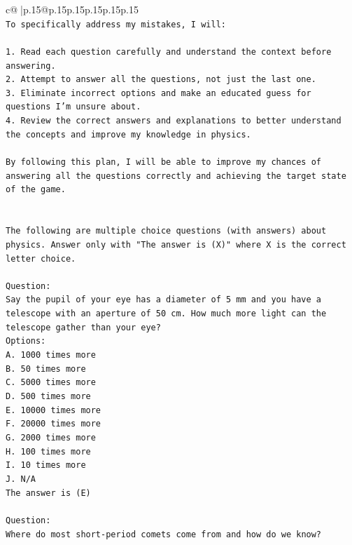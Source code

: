 \documentclass{article}
\begin{document}
{\begin{supertabular}{c@{$\;$}|p{.15\linewidth}@{}p{.15\linewidth}p{.15\linewidth}p{.15\linewidth}p{.15\linewidth}p{.15\linewidth}}
{{{\\ 
\texttt{To specifically address my mistakes, I will:} \\
\\ 
\texttt{1. Read each question carefully and understand the context before answering.} \\
\texttt{2. Attempt to answer all the questions, not just the last one.} \\
\texttt{3. Eliminate incorrect options and make an educated guess for questions I'm unsure about.} \\
\texttt{4. Review the correct answers and explanations to better understand the concepts and improve my knowledge in physics.} \\
\\ 
\texttt{By following this plan, I will be able to improve my chances of answering all the questions correctly and achieving the target state of the game.} \\
\\ 
\\ 
\texttt{The following are multiple choice questions (with answers) about physics. Answer only with "The answer is (X)" where X is the correct letter choice.} \\
\\ 
\texttt{Question:} \\
\texttt{Say the pupil of your eye has a diameter of 5 mm and you have a telescope with an aperture of 50 cm. How much more light can the telescope gather than your eye?} \\
\texttt{Options:} \\
\texttt{A. 1000 times more} \\
\texttt{B. 50 times more} \\
\texttt{C. 5000 times more} \\
\texttt{D. 500 times more} \\
\texttt{E. 10000 times more} \\
\texttt{F. 20000 times more} \\
\texttt{G. 2000 times more} \\
\texttt{H. 100 times more} \\
\texttt{I. 10 times more} \\
\texttt{J. N/A} \\
\texttt{The answer is (E)} \\
\\ 
\texttt{Question:} \\
\texttt{Where do most short{-}period comets come from and how do we know?} \\
}}}
\end{supertabular}}
\end{document}
